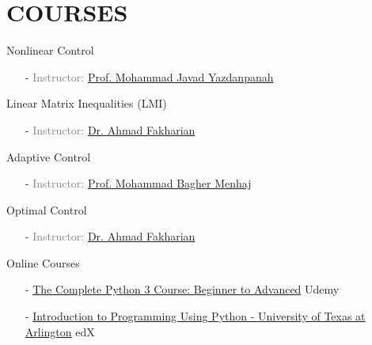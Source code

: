 \documentclass[10pt,a4paper,sans]{moderncv} %
\begin{document}
	\section{COURSES}
	\vspace{-1em}
	\begin{multicols}{2}
		
		 Nonlinear Control %
		\begin{itemize}[nosep, leftmargin=0.9cm]
			\item[-] \textcolor{gray}{Instructor: \href{https://scholar.google.com/citations?user=R5N3R7gAAAAJ}{Prof. Mohammad Javad Yazdanpanah}}
		\end{itemize}
			
		 Linear Matrix Inequalities (LMI) %
		\begin{itemize}[nosep, leftmargin=0.9cm]
			\item[-] \textcolor{gray}{Instructor: \href{https://scholar.google.com/citations?hl=en&user=bI_eOLAAAAAJ}{Dr. Ahmad Fakharian}}
		\end{itemize}
			
		 Adaptive Control %
		\begin{itemize}[nosep, leftmargin=0.9cm]
			\item[-] \textcolor{gray}{Instructor: \href{https://scholar.google.com/citations?hl=en&user=0EN-JbQAAAAJ}{Prof. Mohammad Bagher Menhaj}}
		\end{itemize}
			
		 Optimal Control %
		\begin{itemize}[nosep, leftmargin=0.9cm]
			\item[-] \textcolor{gray}{Instructor: \href{https://scholar.google.com/citations?hl=en&user=bI_eOLAAAAAJ}{Dr. Ahmad Fakharian}}
		\end{itemize}
		
	\end{multicols}
	
	 Online Courses
		\begin{itemize}[nosep, leftmargin=0.9cm]
			\item[-] %
			\href{https://www.udemy.com/certificate/UC-3c2dbfa0-4798-43ab-8914-959045a865ee/}{The Complete Python 3 Course: Beginner to Advanced} \hfill Udemy
			\item[-] \href{https://github.com/mohakhalili/MyPy_TinyCodes}{Introduction to Programming Using Python - University of Texas at Arlington} \hfill edX
		\end{itemize}
	
\end{document}
